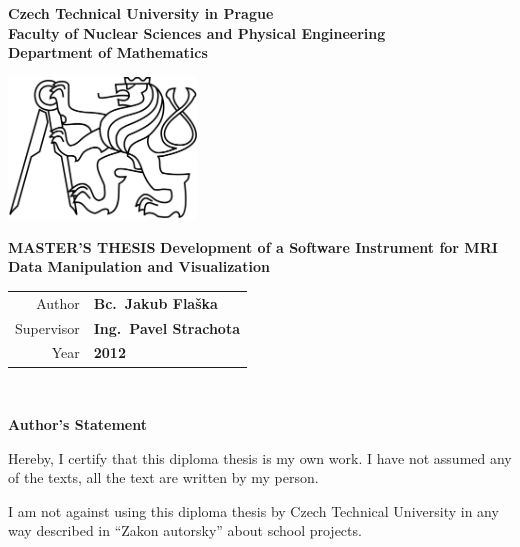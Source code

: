 \documentclass[a4paper,12pt]{report}	%
\newcommand{\cvut}{Czech Technical University in Prague}
\newcommand{\fjfi}{Faculty of Nuclear Sciences and Physical Engineering}
\newcommand{\km}{Department of Mathematics}
\newcommand{\nazeven}{Development of a Software Instrument for MRI Data Manipulation and Visualization }
\newcommand{\autor}{Bc.~Jakub Flaška}
\newcommand{\rok}{2012}
\newcommand{\vedouci}{Ing.~Pavel Strachota}
\begin{document}

\thispagestyle{empty}

\begin{center}
	{\fontsize{15}{15.5} \bf \cvut\\[2mm] \fjfi \\[2mm] \km}	%
	\vfill
		\begin{center}
			\includegraphics[width=50mm]{Text/IMG/00_Logo_CVUT_bw.jpg}	%
		\end{center}
	\vfill
		{\fontsize{35}{36.5} \bf MASTER'S THESIS}		%
	\vfill			
		{\fontsize{20}{20.5} \bf \nazeven}	%
	\vfill	
		{\large %
			\begin{tabular}{rl}
				Author 		& {\bf	\autor}			\\					%
				Supervisor 	& {\bf	\vedouci }		\\					%
				Year		& {\bf	\rok }			\\					%
			\end{tabular}
		}
\end{center}


\newpage
\tableofcontents


\newpage
\thispagestyle{empty} 

 

\newpage
\thispagestyle{empty}

~
\vfill %

{\bf Author's Statement}

\vspace{0.5cm} %

Hereby, I certify that this diploma thesis is my own work. I have not assumed any of the texts, all the text are written by my person. 

I am not against using this diploma thesis by Czech Technical University in any way described in ``Zakon autorsky'' about school projects.
\end{document}
